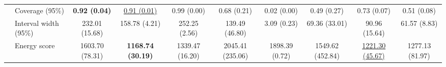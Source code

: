 \begin{table}[t]
\begin{tabular}{llcccccccc}
 & Coverage (95\%) & \textbf{0.92 (0.04)} & \underline{0.91 (0.01)} & 0.99 (0.00) & 0.68 (0.21) & 0.02 (0.00) & 0.49 (0.27) & 0.73 (0.07) & 0.51 (0.08) \\
 & Interval width (95\%) & 232.01 (15.68) & 158.78 (4.21) & 252.25 (2.56) & 139.49 (46.80) & 3.09 (0.23) & 69.36 (33.01) & 90.96 (15.64) & 61.57 (8.83) \\
 & Energy score & 1603.70 (78.31) & \textbf{1168.74 (30.19)} & 1339.47 (16.20) & 2045.41 (235.06) & 1898.39 (0.72) & 1549.62 (452.84) & \underline{1221.30 (45.67)} & 1277.13 (81.97) \\
\bottomrule
\end{tabular}
\end{table}